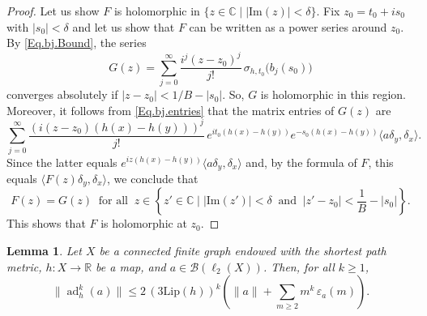 \documentclass[11pt]{amsart}
\newcommand{\R}{\mathbb{R}}
\newcommand{\C}{\mathbb{C}}
\newcommand{\cB}{\mathcal{B}}
\newcommand{\eps}{\varepsilon}
\newcommand{\Lip}{\mathrm{Lip}}
\numberwithin{equation}{section}
\newtheorem{lemma}[theorem]{Lemma}
\theoremstyle{definition}
\theoremstyle{remark}
\DeclareMathOperator{\ad}{ad}
\begin{document}
\begin{proof}
Let us show $F$ is holomorphic in $\{z\in \C\mid |\mathrm{Im}(z)|<\delta\}$. Fix $z_0=t_0+is_0$ with $|s_0|<\delta$ and let us show that $F$ can be written as a power series around $z_0$. By \eqref{Eq.bj.Bound}, the series
\[G(z)=\sum_{j=0}^\infty \frac{i^j(z-z_0)^j}{j!}\,\sigma_{h,t_0}\big(b_j(s_0)\big)\]
converges absolutely if $|z-z_0|<1/B-|s_0|$. So, $G$ is holomorphic in this region. Moreover, it follows from  \eqref{Eq.bj.entries} that the matrix entries of $G(z)$ are
\[\sum_{j=0}^\infty\frac{(i(z-z_0)(h(x)-h(y)))^j}{j!}\,e^{it_0(h(x)-h(y))}e^{-s_0(h(x)-h(y))}\langle a\delta_y,\delta_x\rangle.\]
Since the latter equals $e^{iz(h(x)-h(y))}\langle a\delta_y,\delta_x\rangle$ and, by the formula of $F$, this equals $\langle F(z)\delta_y,\delta_x\rangle$, we conclude that
\[F(z)=G(z)\ \text{ for all }\ z\in \left\{z'\in \C \mid |\mathrm{Im}(z')|<\delta \ \text{ and }\ |z'-z_0|<\frac{1}{B}-|s_0|\right\}.\] This shows that  $F$ is holomorphic at $z_0$.
\end{proof}




\begin{lemma}\label{Lemma.IterSlicing}
Let $X$ be a connected finite  graph endowed with the shortest path metric,    $h\colon X\to\R$ be a map,   and $a\in\cB(\ell_2(X))$. Then, for all $k\geq1$,
\[\|\ad_h^k(a)\|\leq 2\,(3\Lip(h))^k\left(\|a\|+\sum_{m\geq2}m^k\,\eps_a(m)\right).\]
\end{lemma}
\end{document}
